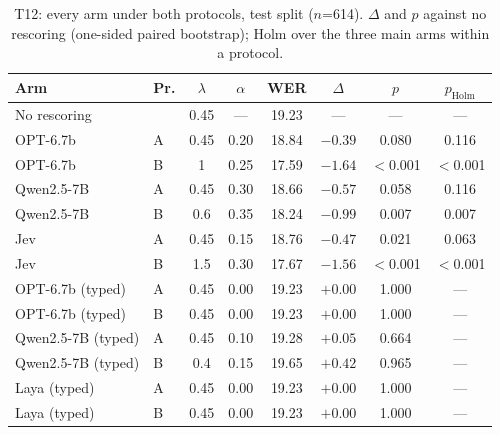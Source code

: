 \begin{table}[h]
\centering\scriptsize
\setlength{\tabcolsep}{3pt}
\begin{tabular}{llcccccc}
\toprule
Arm & Pr. & $\lambda$ & $\alpha$ & WER & $\Delta$ & $p$ & $p_{\text{Holm}}$ \\
\midrule
No rescoring & & 0.45 & --- & 19.23 & --- & --- & --- \\
OPT-6.7b & A & 0.45 & 0.20 & 18.84 & $-0.39$ & 0.080 & 0.116 \\
OPT-6.7b & B & 1 & 0.25 & 17.59 & $-1.64$ & $<$0.001 & $<$0.001 \\
Qwen2.5-7B & A & 0.45 & 0.30 & 18.66 & $-0.57$ & 0.058 & 0.116 \\
Qwen2.5-7B & B & 0.6 & 0.35 & 18.24 & $-0.99$ & 0.007 & 0.007 \\
Jev & A & 0.45 & 0.15 & 18.76 & $-0.47$ & 0.021 & 0.063 \\
Jev & B & 1.5 & 0.30 & 17.67 & $-1.56$ & $<$0.001 & $<$0.001 \\
OPT-6.7b (typed) & A & 0.45 & 0.00 & 19.23 & $+0.00$ & 1.000 & --- \\
OPT-6.7b (typed) & B & 0.45 & 0.00 & 19.23 & $+0.00$ & 1.000 & --- \\
Qwen2.5-7B (typed) & A & 0.45 & 0.10 & 19.28 & $+0.05$ & 0.664 & --- \\
Qwen2.5-7B (typed) & B & 0.4 & 0.15 & 19.65 & $+0.42$ & 0.965 & --- \\
Laya (typed) & A & 0.45 & 0.00 & 19.23 & $+0.00$ & 1.000 & --- \\
Laya (typed) & B & 0.45 & 0.00 & 19.23 & $+0.00$ & 1.000 & --- \\
\bottomrule
\end{tabular}
\caption{T12: every arm under both protocols, test split ($n$=614). $\Delta$ and $p$ against no rescoring (one-sided paired bootstrap); Holm over the three main arms within a protocol.}
\label{tab:fullt12}
\end{table}

